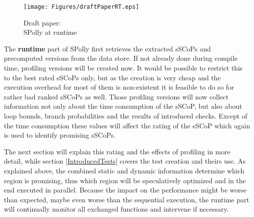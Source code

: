 \begin{figure}
  \centering
  \texttt{[image: Figures/draftPaperRT.eps]}
  \caption{Draft paper: \\ SPolly at runtime}
  \vspace*{-5mm}
  \label{fig:draftPaperCT}  
\end{figure}
The \textbf{runtime} part of SPolly first retrieves the extracted sSCoPs and 
precomputed versions from the data store. If not already done during  compile
time, profiling versions will be created now. It would be possible to restrict
this to the best rated sSCoPs only, but as the creation is very cheap and the execution 
overhead for most of them is non-existent it is feasible to do so for rather bad
ranked sSCoPs as well. Those profiling versions will now collect information
not only about the time consumption of the sSCoP, but also about loop bounds,
branch probabilities and the results of introduced checks. Except of the time
consumption these values will affect the rating of the sSCoP which again is used
to identify promising sSCoPs.

The next section will explain this rating and the effects of profiling in more 
detail, while section \ref{IntroducedTests} covers the test creation and theirs use. 
As explained above, the combined static and dynamic information determine which region
is promising, thus which region will be speculatively optimized and in the end
executed in parallel. Because the impact on the performance might be worse than
expected, maybe even worse than the sequential execution, the runtime part will
continually monitor all exchanged functions and intervene if necessary.




